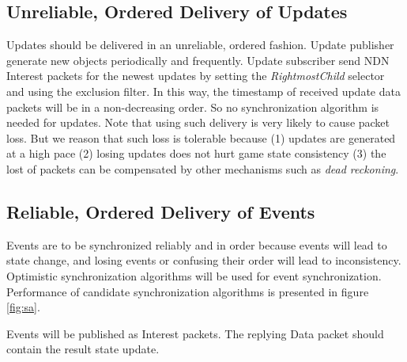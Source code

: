 \documentclass{article}
\begin{document}
\subsection{Unreliable, Ordered Delivery of Updates}
\label{sec:upd}
Updates should be delivered in an unreliable, ordered fashion. Update publisher generate new objects periodically and frequently. Update subscriber send NDN Interest packets for the newest updates by setting the \emph{RightmostChild} selector and using the exclusion filter. In this way, the timestamp of received update data packets will be in a non-decreasing order. So no synchronization algorithm is needed for updates. Note that using such delivery is very likely to cause packet loss. But we reason that such loss is tolerable because (1) updates are generated at a high pace (2) losing updates does not hurt game state consistency (3) the lost of packets can be compensated by other mechanisms such as \emph{dead reckoning}.

\subsection{Reliable, Ordered Delivery of Events}
\label{sec:evt}
Events are to be synchronized reliably and in order because events will lead to state change, and losing events or confusing their order will lead to inconsistency. Optimistic synchronization algorithms will be used for event synchronization. Performance of candidate synchronization algorithms is presented in figure \ref{fig:sa}.

Events will be published as Interest packets. The replying Data packet should contain the result state update.



\end{document}
